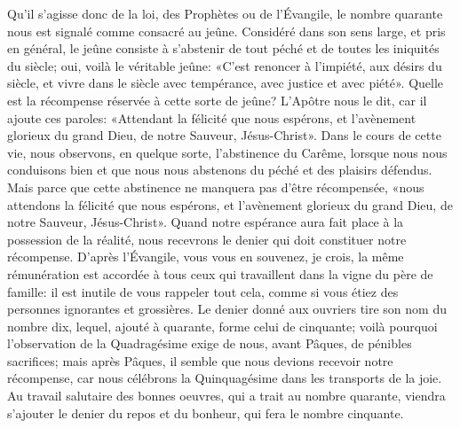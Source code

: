 Qu’il s’agisse donc de la loi, des Prophètes ou de l’Évangile,
	le nombre quarante nous est signalé comme consacré au jeûne.
Considéré dans son sens large, et pris en général,
	le jeûne consiste à s’abstenir de tout péché et de toutes les iniquités du siècle;
	oui, voilà le véritable jeûne:
	«C’est renoncer à l’impiété, aux désirs du siècle,
	et vivre dans le siècle avec tempérance, avec justice et avec piété».
Quelle est la récompense réservée à cette sorte de jeûne?
L’Apôtre nous le dit, car il ajoute ces paroles:
	«Attendant la félicité que nous espérons,
	et l’avènement glorieux du grand Dieu, de notre Sauveur, Jésus-Christ».
Dans le cours de cette vie, nous observons, en quelque sorte, l’abstinence du Carême, 
	lorsque nous nous conduisons bien
		et que nous nous abstenons du péché et des plaisirs défendus.
Mais parce que cette abstinence ne manquera pas d’être récompensée,
	«nous attendons la félicité que nous espérons,
	et l’avènement glorieux du grand Dieu, de notre Sauveur, Jésus-Christ».
Quand notre espérance aura fait place à la possession de la réalité,
	nous recevrons le denier qui doit constituer notre récompense.
D’après l’Évangile, vous vous en souvenez, je crois,
	la même rémunération est accordée
		à tous ceux qui travaillent dans la vigne du père de famille:
	il est inutile de vous rappeler tout cela,
		comme si vous étiez des personnes ignorantes et grossières.
Le denier donné aux ouvriers tire son nom du nombre dix,
	lequel, ajouté à quarante, forme celui de cinquante;
	voilà pourquoi l’observation de la Quadragésime
		exige de nous, avant Pâques, de pénibles sacrifices;
	mais après Pâques, il semble que nous devions recevoir notre récompense,
	car nous célébrons la Quinquagésime dans les transports de la joie.
Au travail salutaire des bonnes oeuvres, qui a trait au nombre quarante,
	viendra s’ajouter le denier du repos et du bonheur, qui fera le nombre cinquante.
